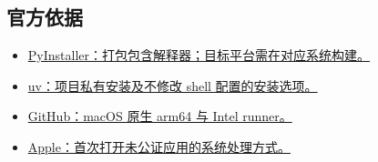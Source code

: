\documentclass[UTF8,fontset=fandol,11pt]{ctexart}
\begin{document}
\subsection*{官方依据}
{\small
\begin{itemize}
\item \href{https://pyinstaller.org/en/stable/operating-mode.html}{PyInstaller：打包包含解释器；目标平台需在对应系统构建。}
\item \href{https://docs.astral.sh/uv/reference/installer/}{uv：项目私有安装及不修改 shell 配置的安装选项。}
\item \href{https://docs.github.com/en/actions/reference/runners/github-hosted-runners}{GitHub：macOS 原生 arm64 与 Intel runner。}
\item \href{https://support.apple.com/en-us/102445}{Apple：首次打开未公证应用的系统处理方式。}
\end{itemize}}
\end{document}
